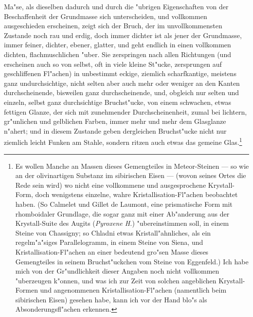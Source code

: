 \documentclass[a4paper, 11pt, oneside, german]{article}
\begin{document}
Ma"se, als dieselben dadurch und durch die "ubrigen Eigenschaften von der Beschaffenheit der Grundmasse sich unterscheiden, und vollkommen ausgeschieden erscheinen, zeigt sich der Bruch, der im unvollkommensten Zustande noch rau und erdig, doch immer dichter ist als jener der Grundmasse, immer feiner, dichter, ebener, glatter, und geht endlich in einen vollkommen dichten, flachmuschlichen "uber. Sie zerspringen nach allen Richtungen (und erscheinen auch so von selbst, oft in viele kleine St"ucke, zersprungen auf geschliffenen Fl"achen) in unbestimmt eckige, ziemlich scharfkantige, meistens ganz undurchsichtige, nicht selten aber auch mehr oder weniger an den Kanten durchscheinende, bisweilen ganz durchscheinende, und, obgleich nur selten und einzeln, selbst ganz durchsichtige Bruchst"ucke, von einem schwachen, etwas fettigen Glanze, der sich mit zunehmender Durchscheinenheit, zumal bei lichtern, gr"unlichen und gelblichen Farben, immer mehr und mehr dem Glasglanze n"ahert; und in diesem Zustande geben dergleichen Bruchst"ucke nicht nur ziemlich leicht Funken am Stahle, sondern ritzen auch etwas das gemeine Glas.\footnote{Es wollen Manche an Massen dieses Gemengteiles in Meteor-Steinen --- so wie an der olivinartigen Substanz im sibirischen Eisen --- (wovon seines Ortes die Rede sein wird) wo nicht eine vollkommene und ausgesprochene Krystall-Form, doch wenigstens einzelne, wahre Kristallisation-Fl"achen beobachtet haben. (So Calmelet und Gillet de Laumont, eine prismatische Form mit rhomboidaler Grundlage, die sogar ganz mit einer Ab"anderung aus der Krystall-Suite des Augits (\emph{Pyroxene H.}) "ubereinstimmen soll, in einem Steine von Chassigny; so Chladni etwas Kristall"ahnliches, als ein regelm"a"siges Parallelogramm, in einem Steine von Siena, und Kristallisation-Fl"achen an einer bedeutend gro"sen Masse dieses Gemengteiles in seinem Bruchst"uckchen vom Steine von Eggenfeld.) Ich habe mich von der Gr"undlichkeit dieser Angaben noch nicht vollkommen "uberzeugen k"onnen, und was ich zur Zeit von solchen angeblichen Krystall-Formen und angenommenen Kristallisation-Fl"achen (namentlich beim sibirischen Eisen) gesehen habe, kann ich vor der Hand blo"s als Absonderungsfl"achen erkennen.}
\end{document}
